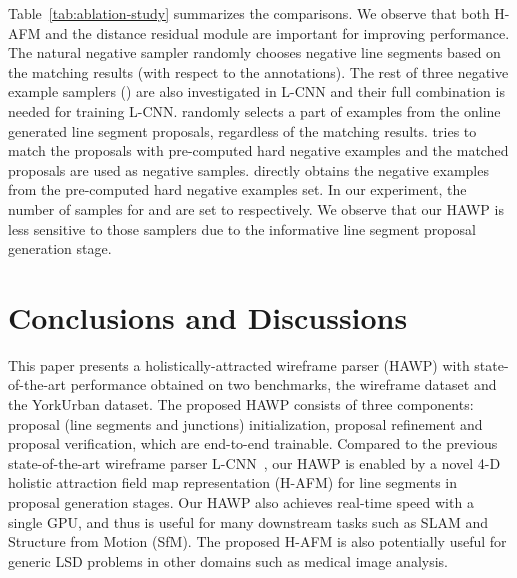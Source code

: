 \documentclass[10pt,twocolumn,letterpaper]{article}
\begin{document}
Table~\ref{tab:ablation-study} summarizes the comparisons. We observe that both H-AFM and the distance residual module are important for improving performance. 
The natural negative sampler  randomly chooses negative line segments based on the matching results (with respect to the annotations).
The rest of three negative example samplers () are also investigated in L-CNN and their full combination is needed for training L-CNN.   randomly selects a part of examples from the online generated line segment proposals, regardless of the matching results.  tries to match the proposals with pre-computed hard negative examples and the matched proposals are used as negative samples.  directly obtains the negative examples from the pre-computed hard negative examples set. 
In our experiment, the number of samples for  and  are set to  respectively. 
We observe that our HAWP is less sensitive to those samplers due to the informative line segment proposal generation stage.  

\section{Conclusions and Discussions}\vspace{-2mm}
This paper presents a holistically-attracted wireframe parser (HAWP) with state-of-the-art performance obtained on two benchmarks, the wireframe dataset and the YorkUrban dataset. The proposed HAWP consists of three components: proposal (line segments and junctions) initialization, proposal refinement and proposal verification, which are end-to-end trainable. Compared to the previous state-of-the-art wireframe parser L-CNN~\cite{ZhouQM19}, our HAWP is enabled by a novel 4-D holistic attraction field map representation  (H-AFM) for line segments in proposal generation stages. Our HAWP also achieves real-time speed with a single GPU, and thus is useful for many downstream tasks such as SLAM and Structure from Motion (SfM). The proposed H-AFM is also potentially useful for generic LSD problems in other domains such as medical image analysis.  


{\small


}
\end{document}
